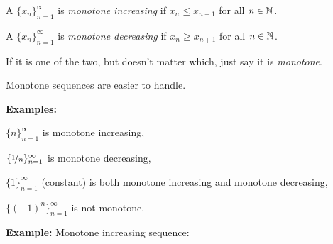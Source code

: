 \documentclass[10pt,aspectratio=169]{beamer}
\begin{document}
\begin{frame}
\begin{definition}
A $\{ x_n \}_{n=1}^\infty$ is \emph{monotone increasing} if $x_n \leq x_{n+1}$ for all $n \in {\mathbb{N}}$.  

\pause
A $\{ x_n \}_{n=1}^\infty$ is \emph{monotone decreasing} if $x_n \geq x_{n+1}$ for all $n \in {\mathbb{N}}$.  

\pause
If it is one of the two, but doesn't matter which, just say it is \emph{monotone}.
\end{definition}

\pause

Monotone sequences are easier to handle.

\medskip
\pause

\textbf{Examples:}

\pause
$\{ n \}_{n=1}^\infty$ is monotone increasing,

\pause
$\{ \nicefrac{1}{n} \}_{n=1}^\infty$ is monotone decreasing,

\pause
$\{ 1 \}_{n=1}^\infty$ (constant) is both monotone increasing and monotone decreasing,

\pause
$\{ {(-1)}^n \}_{n=1}^\infty$ is not monotone.

\end{frame}

\begin{frame}
\textbf{Example:} Monotone increasing sequence:

\begin{center}
\end{center}

\end{frame}
\end{document}
